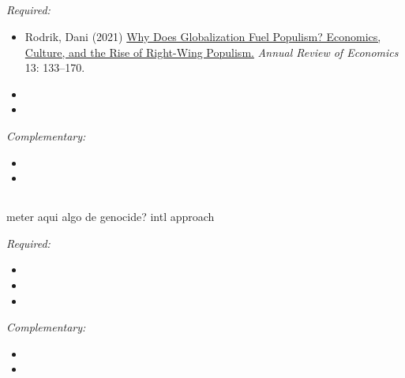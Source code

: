 \documentclass[12pt, a4paper]{article}
\begin{document}
\vspace{20pt}
\hline
\subsection*{{\color{red}{Session 5: Political economy}}}

\noindent\textit{Required:}

\begin{itemize}
  \item Rodrik, Dani (2021) \href{https://www.annualreviews.org/doi/abs/10.1146/annurev-economics-070220-032416}{Why Does Globalization Fuel Populism? Economics, Culture, and the Rise of Right-Wing Populism.} \textit{Annual Review of Economics} 13: 133--170.
  \item
  \item
\end{itemize}

\noindent\textit{Complementary:}

\begin{itemize}
  \item
  \item
\end{itemize}

\vspace{20pt}
\hline
\subsection*{{\color{red}{Session 6: International borders and state size}}}

meter aqui algo de genocide? intl approach

\noindent\textit{Required:}

\begin{itemize}
  \item
  \item
  \item
\end{itemize}

\noindent\textit{Complementary:}

\begin{itemize}
  \item
  \item
\end{itemize}

\vspace{20pt}
\hline
\end{document}

